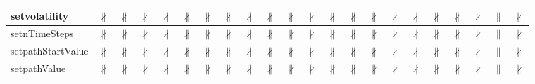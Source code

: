 \documentclass[10pt]{article}
\begin{document}
\begin{longtable}{|l|l|l|l|l|l|l|l|l|l|l|l|l|l|l|l|l|l|l|l|l|l|}
\hline
setvolatility&{\color{BrickRed}$\nparallel$}&{\color{BrickRed}$\nparallel$}&{\color{BrickRed}$\nparallel$}&{\color{BrickRed}$\nparallel$}&{\color{BrickRed}$\nparallel$}&{\color{BrickRed}$\nparallel$}&{\color{BrickRed}$\nparallel$}&{\color{BrickRed}$\nparallel$}&{\color{BrickRed}$\nparallel$}&{\color{BrickRed}$\nparallel$}&{\color{BrickRed}$\nparallel$}&{\color{BrickRed}$\nparallel$}&{\color{BrickRed}$\nparallel$}&{\color{BrickRed}$\nparallel$}&{\color{BrickRed}$\nparallel$}&{\color{BrickRed}$\nparallel$}&{\color{BrickRed}$\nparallel$}&{\color{BrickRed}$\nparallel$}&{\color{BrickRed}$\nparallel$}&{\color{blue}$\parallel$}&{\color{BrickRed}$\nparallel$}\\
\hline
setnTimeSteps&{\color{BrickRed}$\nparallel$}&{\color{BrickRed}$\nparallel$}&{\color{BrickRed}$\nparallel$}&{\color{BrickRed}$\nparallel$}&{\color{BrickRed}$\nparallel$}&{\color{BrickRed}$\nparallel$}&{\color{BrickRed}$\nparallel$}&{\color{BrickRed}$\nparallel$}&{\color{BrickRed}$\nparallel$}&{\color{BrickRed}$\nparallel$}&{\color{BrickRed}$\nparallel$}&{\color{BrickRed}$\nparallel$}&{\color{BrickRed}$\nparallel$}&{\color{BrickRed}$\nparallel$}&{\color{BrickRed}$\nparallel$}&{\color{BrickRed}$\nparallel$}&{\color{BrickRed}$\nparallel$}&{\color{BrickRed}$\nparallel$}&{\color{BrickRed}$\nparallel$}&{\color{blue}$\parallel$}&{\color{BrickRed}$\nparallel$}\\
\hline
setpathStartValue&{\color{BrickRed}$\nparallel$}&{\color{BrickRed}$\nparallel$}&{\color{BrickRed}$\nparallel$}&{\color{BrickRed}$\nparallel$}&{\color{BrickRed}$\nparallel$}&{\color{BrickRed}$\nparallel$}&{\color{BrickRed}$\nparallel$}&{\color{BrickRed}$\nparallel$}&{\color{BrickRed}$\nparallel$}&{\color{BrickRed}$\nparallel$}&{\color{BrickRed}$\nparallel$}&{\color{BrickRed}$\nparallel$}&{\color{BrickRed}$\nparallel$}&{\color{BrickRed}$\nparallel$}&{\color{BrickRed}$\nparallel$}&{\color{BrickRed}$\nparallel$}&{\color{BrickRed}$\nparallel$}&{\color{BrickRed}$\nparallel$}&{\color{BrickRed}$\nparallel$}&{\color{blue}$\parallel$}&{\color{BrickRed}$\nparallel$}\\
\hline
setpathValue&{\color{BrickRed}$\nparallel$}&{\color{BrickRed}$\nparallel$}&{\color{BrickRed}$\nparallel$}&{\color{BrickRed}$\nparallel$}&{\color{BrickRed}$\nparallel$}&{\color{BrickRed}$\nparallel$}&{\color{BrickRed}$\nparallel$}&{\color{BrickRed}$\nparallel$}&{\color{BrickRed}$\nparallel$}&{\color{BrickRed}$\nparallel$}&{\color{BrickRed}$\nparallel$}&{\color{BrickRed}$\nparallel$}&{\color{BrickRed}$\nparallel$}&{\color{BrickRed}$\nparallel$}&{\color{BrickRed}$\nparallel$}&{\color{BrickRed}$\nparallel$}&{\color{BrickRed}$\nparallel$}&{\color{BrickRed}$\nparallel$}&{\color{BrickRed}$\nparallel$}&{\color{blue}$\parallel$}&{\color{BrickRed}$\nparallel$}\\

\end{longtable}
\end{document}
